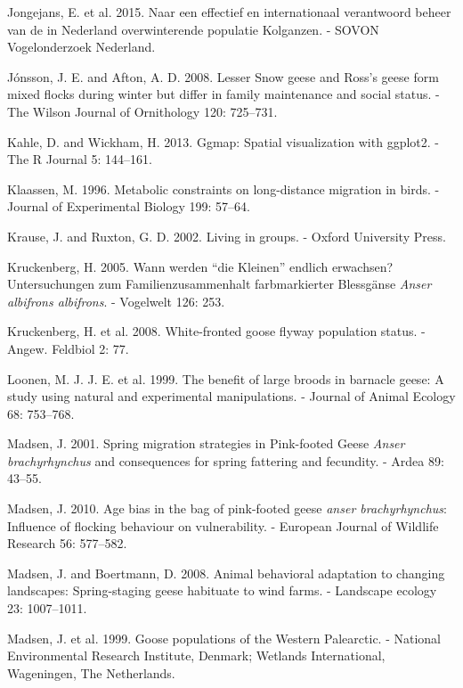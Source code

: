 \documentclass[10pt,twocolumn]{paper}
\begin{document}
\hypertarget{ref-jongejans2015naar}{}
Jongejans, E. et al. 2015. Naar een effectief en internationaal
verantwoord beheer van de in Nederland overwinterende populatie
Kolganzen. - SOVON Vogelonderzoek Nederland.

\hypertarget{ref-jonsson2008lesser}{}
Jónsson, J. E. and Afton, A. D. 2008. Lesser Snow geese and Ross's geese
form mixed flocks during winter but differ in family maintenance and
social status. - The Wilson Journal of Ornithology 120: 725--731.

\hypertarget{ref-ggmap}{}
Kahle, D. and Wickham, H. 2013. Ggmap: Spatial visualization with
ggplot2. - The R Journal 5: 144--161.

\hypertarget{ref-Klaassen57}{}
Klaassen, M. 1996. Metabolic constraints on long-distance migration in
birds. - Journal of Experimental Biology 199: 57--64.

\hypertarget{ref-krause2002living}{}
Krause, J. and Ruxton, G. D. 2002. Living in groups. - Oxford University
Press.

\hypertarget{ref-kruckenberg2005young}{}
Kruckenberg, H. 2005. Wann werden ``die Kleinen'' endlich erwachsen?
Untersuchungen zum Familienzusammenhalt farbmarkierter Blessgänse
\emph{Anser albifrons albifrons}. - Vogelwelt 126: 253.

\hypertarget{ref-kruckenberg2008white}{}
Kruckenberg, H. et al. 2008. White-fronted goose flyway population
status. - Angew. Feldbiol 2: 77.

\hypertarget{ref-JANE:JANE325}{}
Loonen, M. J. J. E. et al. 1999. The benefit of large broods in barnacle
geese: A study using natural and experimental manipulations. - Journal
of Animal Ecology 68: 753--768.

\hypertarget{ref-madsen2001spring}{}
Madsen, J. 2001. Spring migration strategies in Pink-footed Geese
\emph{Anser brachyrhynchus} and consequences for spring fattering and
fecundity. - Ardea 89: 43--55.

\hypertarget{ref-Madsen2010}{}
Madsen, J. 2010. Age bias in the bag of pink-footed geese \emph{anser
brachyrhynchus}: Influence of flocking behaviour on vulnerability. -
European Journal of Wildlife Research 56: 577--582.

\hypertarget{ref-madsen2008animal}{}
Madsen, J. and Boertmann, D. 2008. Animal behavioral adaptation to
changing landscapes: Spring-staging geese habituate to wind farms. -
Landscape ecology 23: 1007--1011.

\hypertarget{ref-madsen1999goose}{}
Madsen, J. et al. 1999. Goose populations of the Western Palearctic. -
National Environmental Research Institute, Denmark; Wetlands
International, Wageningen, The Netherlands.
\end{document}
